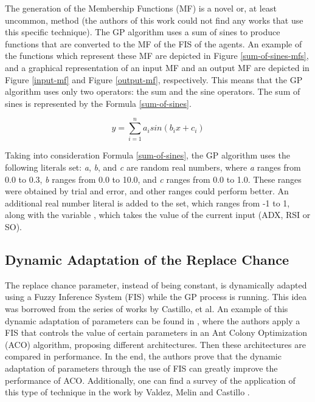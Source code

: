 \documentclass[12pt,journal,draftcls,onecolumn]{IEEEtran}
\begin{document}
The generation of the Membership Functions (MF) is a novel or, at least uncommon, method (the authors of this work could not find any works that use this specific technique). The GP algorithm uses a sum of sines to produce functions that are converted to the MF of the FIS of the agents. An example of the functions which represent these MF are depicted in Figure \ref{sum-of-sines-mfs}, and a graphical representation of an input MF and an output MF are depicted in Figure \ref{input-mf} and Figure \ref{output-mf}, respectively. This means that the GP algorithm uses only two operators: the sum and the sine operators. The sum of sines is represented by the Formula \ref{sum-of-sines}.

\begin{equation} \label{sum-of-sines}
  y = \sum_{i=1}^{n} a_{i} sin(b_{i}x + c_{i})
\end{equation}

Taking into consideration Formula \ref{sum-of-sines}, the GP algorithm uses the following literals set: \textit{a}, \textit{b}, and \textit{c} are random real numbers, where \textit{a} ranges from 0.0 to 0.3, \textit{b} ranges from 0.0 to 10.0, and \textit{c} ranges from 0.0 to 1.0. These ranges were obtained by trial and error, and other ranges could perform better. An additional real number literal is added to the set, which ranges from -1 to 1, along with the variable , which takes the value of the current input (ADX, RSI or SO).

\subsection{Dynamic Adaptation of the Replace Chance}
\label{dynamic-adaptation-of-the-replace-chance}

The replace chance parameter, instead of being constant, is dynamically adapted using a Fuzzy Inference System (FIS) while the GP process is running. This idea was borrowed from the series of works by Castillo, et al. An example of this dynamic adaptation of parameters can be found in \cite{castillo2015new}, where the authors apply a FIS that controls the value of certain parameters in an Ant Colony Optimization (ACO) algorithm, proposing different architectures. Then these architectures are compared in performance. In the end, the authors prove that the dynamic adaptation of parameters through the use of FIS can greatly improve the performance of ACO. Additionally, one can find a survey of the application of this type of technique in the work by Valdez, Melin and Castillo \cite{valdez2014survey}.
\end{document}
